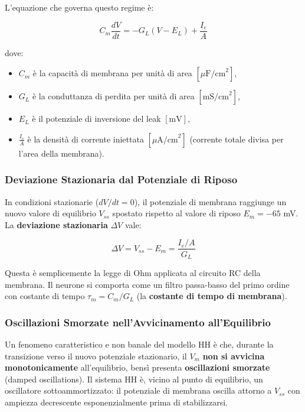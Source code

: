 L'equazione che governa questo regime è:

\begin{equation}
C_m \frac{dV}{dt} = -G_L(V - E_L) + \frac{I_e}{A}
\end{equation}

dove:
\begin{itemize}
    \item $C_m$ è la capacità di membrana per unità di area $[\mu\text{F/cm}^2]$,
    \item $G_L$ è la conduttanza di perdita per unità di area $[\text{mS/cm}^2]$,
    \item $E_L$ è il potenziale di inversione del leak $[\text{mV}]$,
    \item $\frac{I_e}{A}$ è la densità di corrente iniettata $[\mu\text{A/cm}^2]$ (corrente totale divisa per l'area della membrana).
\end{itemize}

\subsubsection{Deviazione Stazionaria dal Potenziale di Riposo}

In condizioni stazionarie ($dV/dt = 0$), il potenziale di membrana raggiunge un nuovo valore di equilibrio $V_{ss}$ spostato rispetto al valore di riposo $E_m = -65$ mV. La \textbf{deviazione stazionaria} $\Delta V$ vale:

\begin{equation}
\Delta V = V_{ss} - E_m = \frac{I_e / A}{G_L}
\end{equation}

Questa è semplicemente la legge di Ohm applicata al circuito RC della membrana. Il neurone si comporta come un filtro passa-basso del primo ordine con costante di tempo $\tau_m = C_m / G_L$ (la \textbf{costante di tempo di membrana}).

\subsubsection{Oscillazioni Smorzate nell'Avvicinamento all'Equilibrio}

Un fenomeno caratteristico e non banale del modello HH è che, durante la transizione verso il nuovo potenziale stazionario, il $V_m$ \textbf{non si avvicina monotonicamente} all'equilibrio, bensì presenta \textbf{oscillazioni smorzate} (damped oscillations). Il sistema HH è, vicino al punto di equilibrio, un oscillatore sottoammortizzato: il potenziale di membrana oscilla attorno a $V_{ss}$ con ampiezza decrescente esponenzialmente prima di stabilizzarsi.

